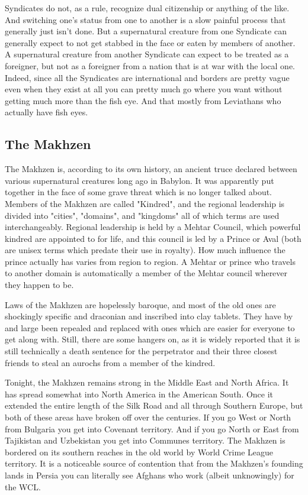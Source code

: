 Syndicates do not, as a rule, recognize dual citizenship or anything of the like. And switching one's status from one to another is a slow painful process that generally just isn't done. But a supernatural creature from one Syndicate can generally expect to not get stabbed in the face or eaten by members of another. A supernatural creature from another Syndicate can expect to be treated as a foreigner, but not as a foreigner from a nation that is at war with the local one. Indeed, since all the Syndicates are international and borders are pretty vague even when they exist at all you can pretty much go where you want without getting much more than the fish eye. And that mostly from Leviathans who actually have fish eyes.

\subsection{The Makhzen} 

The Makhzen is, according to its own history, an ancient truce declared between various supernatural creatures long ago in Babylon. It was apparently put together in the face of some grave threat which is no longer talked about. Members of the Makhzen are called "Kindred", and the regional leadership is divided into "cities", "domains", and "kingdoms" all of which terms are used interchangeably. Regional leadership is held by a Mehtar Council, which powerful kindred are appointed to for life, and this council is led by a Prince or Aval (both are unisex terms which predate their use in royalty). How much influence the prince actually has varies from region to region. A Mehtar or prince who travels to another domain is automatically a member of the Mehtar council wherever they happen to be.

Laws of the Makhzen are hopelessly baroque, and most of the old ones are shockingly specific and draconian and inscribed into clay tablets. They have by and large been repealed and replaced with ones which are easier for everyone to get along with. Still, there are some hangers on, as it is widely reported that it is still technically a death sentence for the perpetrator and their three closest friends to steal an aurochs from a member of the kindred.

Tonight, the Makhzen remains strong in the Middle East and North Africa. It has spread somewhat into North America in the American South. Once it extended the entire length of the Silk Road and all through Southern Europe, but both of these areas have broken off over the centuries. If you go West or North from Bulgaria you get into Covenant territory. And if you go North or East from Tajikistan and Uzbekistan you get into Communes territory. The Makhzen is bordered on its southern reaches in the old world by World Crime League territory. It is a noticeable source of contention that from the Makhzen's founding lands in Persia you can literally see Afghans who work (albeit unknowingly) for the WCL.

